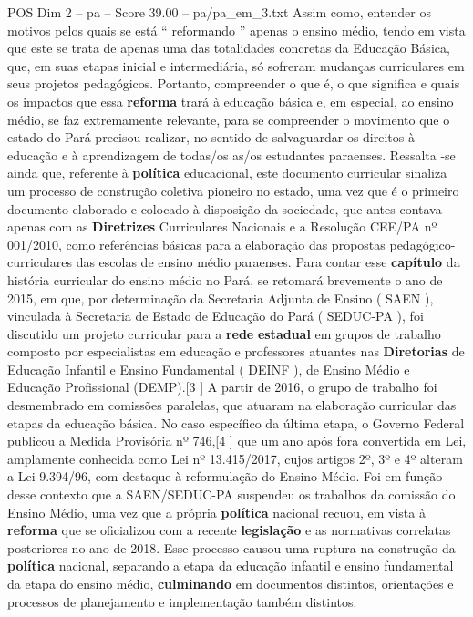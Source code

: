 \begin{textsample}{POS Dim 2 – pa – Score 39.00 – pa/pa\_em\_3.txt}
Assim como, entender os motivos pelos quais se está “ reformando ” apenas o ensino médio, tendo em vista que este se trata de apenas uma das totalidades concretas da Educação Básica, que, em suas etapas inicial e intermediária, só sofreram mudanças curriculares em seus projetos pedagógicos.
Portanto, compreender o que é, o que significa e quais os impactos que essa \textbf{reforma} trará à educação básica e, em especial, ao ensino médio, se faz extremamente relevante, para se compreender o movimento que o estado do Pará precisou realizar, no sentido de salvaguardar os direitos à educação e à aprendizagem de todas/os as/os estudantes paraenses.
Ressalta -se ainda que, referente à \textbf{política} educacional, este documento curricular sinaliza um processo de construção coletiva pioneiro no estado, uma vez que é o primeiro documento elaborado e colocado à disposição da sociedade, que antes contava apenas com as \textbf{Diretrizes} Curriculares Nacionais e a Resolução CEE/PA nº 001/2010, como referências básicas para a elaboração das propostas pedagógico-curriculares das escolas de ensino médio paraenses.
Para contar esse \textbf{capítulo} da história curricular do ensino médio no Pará, se retomará brevemente o ano de 2015, em que, por determinação da Secretaria Adjunta de Ensino ( SAEN ), vinculada à Secretaria de Estado de Educação do Pará ( SEDUC-PA ), foi discutido um projeto curricular para a \textbf{rede} \textbf{estadual} em grupos de trabalho composto por especialistas em educação e professores atuantes nas \textbf{Diretorias} de Educação Infantil e Ensino Fundamental ( DEINF ), de Ensino Médio e Educação Profissional (DEMP).[3 ] A partir de 2016, o grupo de trabalho foi desmembrado em comissões paralelas, que atuaram na elaboração curricular das etapas da educação básica.
No caso específico da última etapa, o Governo Federal publicou a Medida Provisória nº 746,[4 ] que um ano após fora convertida em Lei, amplamente conhecida como Lei nº 13.415/2017, cujos artigos 2º, 3º e 4º alteram a Lei 9.394/96, com destaque à reformulação do Ensino Médio.
Foi em função desse contexto que a SAEN/SEDUC-PA suspendeu os trabalhos da comissão do Ensino Médio, uma vez que a própria \textbf{política} nacional recuou, em vista à \textbf{reforma} que se oficializou com a recente \textbf{legislação} e as normativas correlatas posteriores no ano de 2018.
Esse processo causou uma ruptura na construção da \textbf{política} nacional, separando a etapa da educação infantil e ensino fundamental da etapa do ensino médio, \textbf{culminando} em documentos distintos, orientações e processos de planejamento e implementação também distintos.

\end{textsample}
